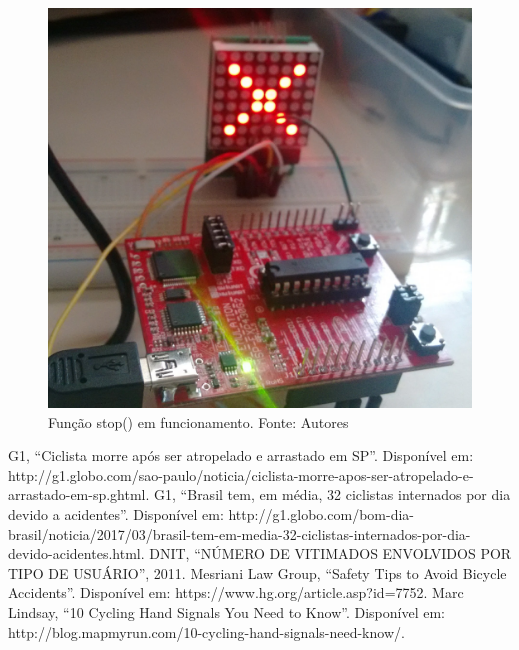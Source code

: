 \documentclass[conference]{IEEEtran}
\begin{document}
\begin{figure}[H]
  \centering
  \includegraphics[width=0.5\linewidth]{parada}
  \caption{Função stop() em funcionamento. Fonte: Autores}
  \label{fig:parada}
\end{figure}

\begin{thebibliography}{00}
   G1, ``Ciclista morre após ser atropelado e arrastado em SP''. Disponível em: http://g1.globo.com/sao-paulo/noticia/ciclista-morre-apos-ser-atropelado-e-arrastado-em-sp.ghtml.
   G1, ``Brasil tem, em média, 32 ciclistas internados por dia devido a acidentes''. Disponível em: http://g1.globo.com/bom-dia-brasil/noticia/2017/03/brasil-tem-em-media-32-ciclistas-internados-por-dia-devido-acidentes.html.
   DNIT, ``NÚMERO DE VITIMADOS ENVOLVIDOS POR TIPO DE USUÁRIO'', 2011.
   Mesriani Law Group, ``Safety Tips to Avoid Bicycle Accidents''. Disponível em: https://www.hg.org/article.asp?id=7752.
   Marc Lindsay, ``10 Cycling Hand Signals You Need to Know''. Disponível em: http://blog.mapmyrun.com/10-cycling-hand-signals-need-know/.


\end{thebibliography}
\end{document}
